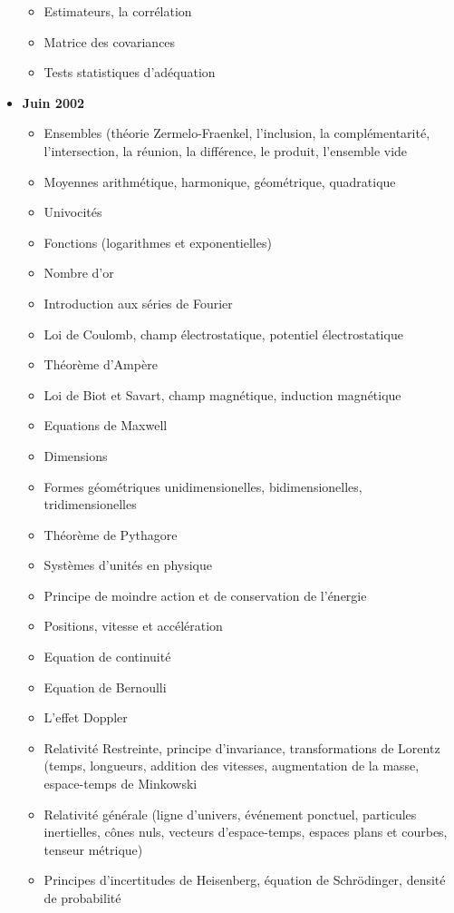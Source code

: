 \documentclass[12pt,a4paper,twoside,openright]{report}
\theoremstyle{definition}
\theoremstyle{itexmp}
\numberwithin{equation}{section}
\begin{document}
\begin{itemize}
\begin{itemize}[noitemsep]
			\item Estimateurs, la corrélation
			\item Matrice des covariances
			\item Tests statistiques d'adéquation 
		\end{itemize}
		\item \textbf{Juin 2002}
			\begin{itemize}[noitemsep]
				\item Ensembles (théorie Zermelo-Fraenkel, l'inclusion, la complémentarité, l'intersection, la réunion, la différence, le produit, l'ensemble vide
				\item Moyennes arithmétique, harmonique, géométrique, quadratique
				\item Univocités
				\item Fonctions (logarithmes et exponentielles)
				\item Nombre d'or
				\item Introduction aux séries de Fourier
				\item Loi de Coulomb, champ électrostatique, potentiel électrostatique
				\item Théorème d'Ampère
				\item Loi de Biot et Savart, champ magnétique, induction magnétique
				\item Equations de Maxwell
				\item Dimensions
				\item Formes géométriques unidimensionelles, bidimensionelles, tridimensionelles
				\item Théorème de Pythagore
				\item Systèmes d'unités en physique
				\item Principe de moindre action et de conservation de l'énergie
				\item Positions, vitesse et accélération
				\item Equation de continuité
				\item Equation de Bernoulli
				\item L'effet Doppler
				\item Relativité Restreinte, principe d'invariance, transformations de Lorentz (temps, longueurs, addition des vitesses, augmentation de la masse, espace-temps de Minkowski
				\item Relativité générale (ligne d'univers, événement ponctuel, particules inertielles, cônes nuls, vecteurs d'espace-temps, espaces plans et courbes, tenseur métrique)
				\item Principes d'incertitudes de Heisenberg, équation de Schrödinger, densité de probabilité

\end{itemize}
\end{itemize}
\end{document}
